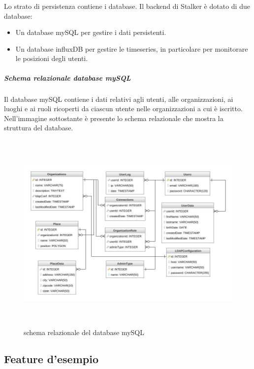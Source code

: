 \documentclass[../manuale-sviluppatore.tex]{subfiles}
\begin{document}
Lo strato di persistenza contiene i database. Il backend di Stalker è dotato di due database:
\begin{itemize}
  \item Un database mySQL per gestire i dati persistenti.
  \item Un database influxDB per gestire le timeseries, in particolare per monitorare le posizioni degli utenti.
\end{itemize}

\subparagraph{Schema relazionale database mySQL}
\label{subp:schema_relazionale_database_mysql}
Il database mySQL contiene i dati relativi agli utenti, alle organizzazioni, ai luoghi e ai ruoli ricoperti da ciascun utente nelle organizzazioni a cui è iscritto.
Nell'immagine sottostante è presente lo schema relazionale che mostra la struttura del database.
\begin{figure}[H]
  \centering
  \includegraphics[width=14cm,height=10cm]{img/server-mysql-diagram.png}
  \caption{schema relazionale del database mySQL}%
   \label{fig: schema relazionale del database mySQL}
\end{figure}

\subsection{Feature d'esempio}
\label{sub:feature_d'esempio}
\end{document}
